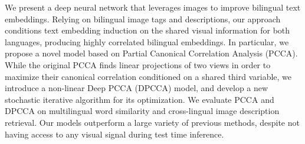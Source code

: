 We present a deep neural network that leverages images to improve bilingual text embeddings. Relying on bilingual image tags and descriptions, our approach conditions text embedding induction on the shared visual information for both languages, producing highly correlated bilingual embeddings. In particular, we propose a novel model based on Partial Canonical Correlation Analysis (PCCA). While the original PCCA finds linear projections of two views in order to maximize their canonical correlation conditioned on a shared third variable, we introduce a non-linear Deep PCCA (DPCCA) model, and develop a new stochastic iterative algorithm for its optimization. We evaluate PCCA and DPCCA on multilingual word similarity and cross-lingual image description retrieval. Our models outperform a large variety of previous methods, despite not having access to any visual signal during test time inference.
